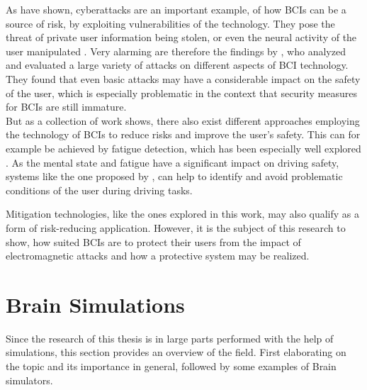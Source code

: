     As \textcite{Bernal.2023} have shown, cyberattacks are an important example, of how BCIs can be a source of risk, by exploiting vulnerabilities of the technology. They pose the threat of private user information being stolen, or even the neural activity of the user manipulated \cite{Backes.2019}. Very alarming are therefore the findings by \textcite{Bernal.2021}, who analyzed and evaluated a large variety of attacks on different aspects of BCI technology. They found that even basic attacks may have a considerable impact on the safety of the user, which is especially problematic in the context that security measures for BCIs are still immature.\\
    But as a collection of work shows, there also exist different approaches employing the technology of BCIs to reduce risks and improve the user's safety. This can for example be achieved by fatigue detection, which has been especially well explored \cite{Backes.2019}. As the mental state and fatigue have a significant impact on driving safety, systems like the one proposed by \textcite{Liu.2015}, can help to identify and avoid problematic conditions of the user during driving tasks.
    
    Mitigation technologies, like the ones explored in this work, may also qualify as a form of risk-reducing application. However, it is the subject of this research to show, how suited BCIs are to protect their users from the impact of electromagnetic attacks and how a protective system may be realized.
    

\section{Brain Simulations}
    Since the research of this thesis is in large parts performed with the help of simulations, this section provides an overview of the field. First elaborating on the topic and its importance in general, followed by some examples of Brain simulators.
    
